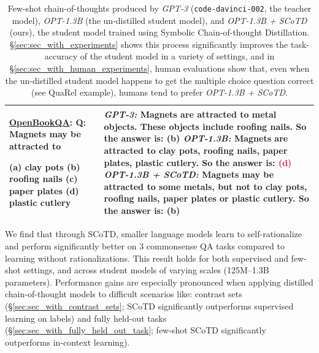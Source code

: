 \documentclass[11pt]{article}
\newcommand\harold[1]{{\color{gray}[#1]$_{harold}$}}
\begin{document}
\begin{table}[ht]
{\begin{tabular}{p{.35\linewidth}p{.65\linewidth}}
        \underline{OpenBookQA}:
        Q: Magnets may be attracted to 
        
        (a) clay pots (b) \textcolor{ballblue}{roofing nails} (c) paper plates (d) plastic cutlery
         &
         \textcolor{dark}{\emph{GPT-3:}}
        Magnets are attracted to metal objects. These objects include roofing nails. So the answer is: \textcolor{ballblue}{(b)} \vspace{1mm} 
        \newline
         \textcolor{dark}{\emph{OPT-1.3B:}}
        Magnets are attracted to clay pots, roofing nails, paper plates, plastic cutlery. So the answer is: \textcolor{crimson}{(d)} \vspace{1mm} 
        \newline
         \textcolor{dark}{\emph{OPT-1.3B + SCoTD:} }
        Magnets may be attracted to some metals, but not to clay pots, roofing nails, paper plates or plastic cutlery. So the answer is: \textcolor{ballblue}{(b)}
        \\

        \bottomrule
    \end{tabular}%
    }
    \caption{Few-shot chain-of-thoughts produced by \emph{GPT-3} (\texttt{code-davinci-002}, the teacher model), \emph{OPT-1.3B} (the un-distilled student model), and \emph{OPT-1.3B + SCoTD} (ours), the student model trained using Symbolic Chain-of-thought Distillation. \S\ref{sec:sec_with_experiments} shows this process significantly improves the task-accuracy of the student model in a variety of settings, and in \S\ref{sec:sec_with_human_experiments}, human evaluations show that, even when the un-distilled student model happens to get the multiple choice question correct (see QuaRel example), humans tend to prefer \emph{OPT-1.3B + SCoTD}.}
    \label{tab:example_CoTs}
\end{table}

We find that through SCoTD, smaller language models learn to self-rationalize and perform significantly better on 3 commonsense QA tasks compared to learning without rationalizations. This result holds for both supervised and few-shot settings, and across student models of varying scales (125M--1.3B parameters).
Performance gains are especially pronounced when applying distilled chain-of-thought models to difficult scenarios like: contrast sets \cite{gardner2020evaluating} (\S\ref{sec:sec_with_contrast_sets}; SCoTD significantly outperforms supervised learning on labels) and fully held-out tasks (\S\ref{sec:sec_with_fully_held_out_task}; few-shot SCoTD significantly outperforms in-context learning). %
\end{document}

